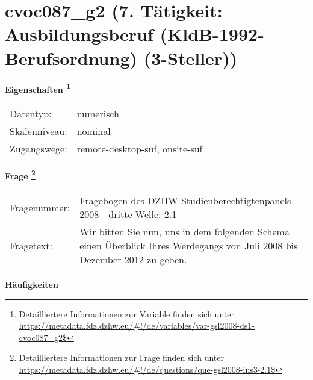 
    \setcounter{footnote}{0}

    \vspace*{-1.8cm}
	\section{cvoc087\_g2 (7. Tätigkeit: Ausbildungsberuf (KldB-1992-Berufsordnung) (3-Steller))}
	\label{section:cvoc087_g2}



    \vspace*{0.5cm}
    \noindent\textbf{Eigenschaften
	\footnote{Detailliertere Informationen zur Variable finden sich unter
		\url{https://metadata.fdz.dzhw.eu/\#!/de/variables/var-gsl2008-ds1-cvoc087_g2$}}}\\
	\begin{tabularx}{\hsize}{@{}lX}
	Datentyp: & numerisch \\
	Skalenniveau: & nominal \\
	Zugangswege: &
	  remote-desktop-suf, 
	  onsite-suf
 \\
    \end{tabularx}



				\vspace*{0.5cm}
                \noindent\textbf{Frage
	                \footnote{Detailliertere Informationen zur Frage finden sich unter
		              \url{https://metadata.fdz.dzhw.eu/\#!/de/questions/que-gsl2008-ins3-2.1$}}}\\
				\begin{tabularx}{\hsize}{@{}lX}
					Fragenummer: &
					  Fragebogen des DZHW-Studienberechtigtenpanels 2008 - dritte Welle:
					  2.1
 \\
					Fragetext: & Wir bitten Sie nun, uns in dem folgenden Schema einen Überblick Ihres Werdegangs von Juli 2008 bis Dezember 2012 zu geben. \\
				\end{tabularx}





        		\vspace*{0.5cm}
                \noindent\textbf{Häufigkeiten}

